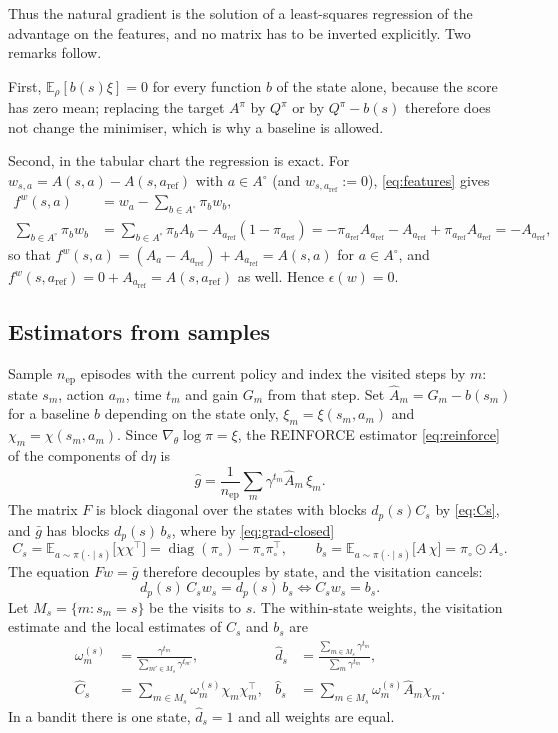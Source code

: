 \documentclass[11pt,a4paper]{article}
\numberwithin{equation}{section}
\theoremstyle{plain}
\theoremstyle{definition}
\theoremstyle{remark}
\newcommand{\E}{\mathbb{E}}
\newcommand{\T}{^{\top}}
\newcommand{\dd}{\mathrm{d}}
\DeclareMathOperator{\diag}{diag}
\newcommand{\aref}{a_{\mathrm{ref}}}
\newcommand{\Ao}{A^{\circ}}
\newcommand{\pio}{\pi_{\circ}}
\begin{document}
Thus the natural gradient is the solution of a least-squares regression of the advantage on the features, and no matrix has to be inverted explicitly. Two remarks follow.

First, $\E_\rho[b(s)\xi]=0$ for every function $b$ of the state alone, because the score has zero mean; replacing the target $A^\pi$ by $Q^\pi$ or by $Q^\pi-b(s)$ therefore does not change the minimiser, which is why a baseline is allowed.

Second, in the tabular chart the regression is exact. For $w_{s,a}=A(s,a)-A(s,\aref)$ with $a\in\Ao$ (and $w_{s,\aref}:=0$), \eqref{eq:features} gives
\begin{align*}
  f^w(s,a)&=w_a-\sum_{b\in\Ao}\pi_bw_b,\\
  \sum_{b\in\Ao}\pi_bw_b&=\sum_{b\in\Ao}\pi_bA_b-A_{\aref}(1-\pi_{\aref})
  =-\pi_{\aref}A_{\aref}-A_{\aref}+\pi_{\aref}A_{\aref}=-A_{\aref},
\end{align*}
so that $f^w(s,a)=(A_a-A_{\aref})+A_{\aref}=A(s,a)$ for $a\in\Ao$, and $f^w(s,\aref)=0+A_{\aref}=A(s,\aref)$ as well. Hence $\epsilon(w)=0$.

\subsection{Estimators from samples}

Sample $n_{\mathrm{ep}}$ episodes with the current policy and index the visited steps by $m$: state $s_m$, action $a_m$, time $t_m$ and gain $G_m$ from that step. Set $\hat A_m=G_m-b(s_m)$ for a baseline $b$ depending on
the state only, $\xi_m=\xi(s_m,a_m)$ and $\chi_m=\chi(s_m,a_m)$. Since $\nabla_\theta\log\pi=\xi$, the REINFORCE estimator \eqref{eq:reinforce} of the components of $\dd\eta$ is
\begin{equation}\label{eq:ghat}
  \hat g=\frac1{n_{\mathrm{ep}}}\sum_m\gamma^{t_m}\hat A_m\,\xi_m .
\end{equation}
The matrix $F$ is block diagonal over the states with blocks $d_p(s)C_s$ by \eqref{eq:Cs}, and $\bar g$ has blocks $d_p(s)\,b_s$, where by \eqref{eq:grad-closed}
\begin{equation}\label{eq:Cs-bs}
  C_s=\E_{a\sim\pi(\cdot\mid s)}\bigl[\chi\chi\T\bigr]=\diag(\pio)-\pio\pio\T,
  \qquad
  b_s=\E_{a\sim\pi(\cdot\mid s)}\bigl[A\,\chi\bigr]=\pio\odot A_\circ .
\end{equation}
The equation $Fw=\bar g$ therefore decouples by state, and the visitation cancels:
\begin{equation}\label{eq:decoupled}
  d_p(s)\,C_sw_s=d_p(s)\,b_s\iff C_sw_s=b_s .
\end{equation}
Let $M_s=\{m:s_m=s\}$ be the visits to $s$. The within-state weights, the visitation estimate and the local estimates of $C_s$ and $b_s$ are
\begin{align}
  \omega^{(s)}_m&=\frac{\gamma^{t_m}}{\sum_{m'\in M_s}\gamma^{t_{m'}}}, &
  \hat d_s&=\frac{\sum_{m\in M_s}\gamma^{t_m}}{\sum_m\gamma^{t_m}},\nonumber\\
  \hat C_s&=\sum_{m\in M_s}\omega^{(s)}_m\chi_m\chi_m\T, &
  \hat b_s&=\sum_{m\in M_s}\omega^{(s)}_m\hat A_m\chi_m .\label{eq:local-estimates}
\end{align}
In a bandit there is one state, $\hat d_s=1$ and all weights are equal.
\end{document}
